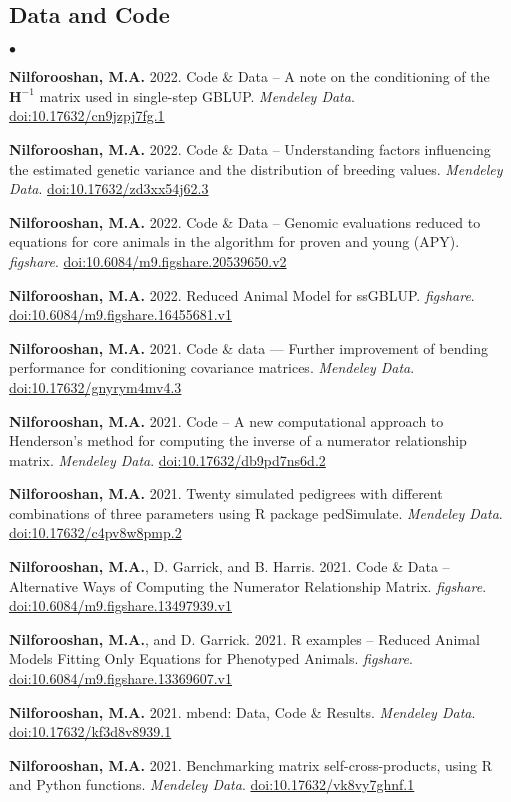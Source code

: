 \documentclass[margin,line]{res}
\newenvironment{list2}{
  \begin{list}{$\bullet$}{%
      \setlength{\itemsep}{0in}
      \setlength{\parsep}{0in} \setlength{\parskip}{0in}
      \setlength{\topsep}{0in} \setlength{\partopsep}{0in}
      \setlength{\leftmargin}{0.2in}}}{\end{list}}
\begin{document}
\begin{resume}
\section{\sc Data and Code}

\begin{list2}
\item {\bf Nilforooshan, M.A.} 2022. Code \& Data -- A note on the conditioning of the $\mathbf H^{-1}$ matrix used in single-step GBLUP. {\em Mendeley Data}. \href{https://doi.org/10.17632/cn9jzpj7fg.1}{doi:10.17632/cn9jzpj7fg.1}
\item {\bf Nilforooshan, M.A.} 2022. Code \& Data -- Understanding factors influencing the estimated genetic variance and the distribution of breeding values. {\em Mendeley Data}. \href{https://doi.org/10.17632/zd3xx54j62.3}{doi:10.17632/zd3xx54j62.3}
\item {\bf Nilforooshan, M.A.} 2022. Code \& Data -- Genomic evaluations reduced to equations for core animals in the algorithm for proven and young (APY). {\em figshare}. \href{https://doi.org/10.6084/m9.figshare.20539650.v1}{doi:10.6084/m9.figshare.20539650.v2}
\item {\bf Nilforooshan, M.A.} 2022. Reduced Animal Model for ssGBLUP. {\em figshare}. \href{https://doi.org/10.6084/m9.figshare.16455681.v1}{doi:10.6084/m9.figshare.16455681.v1}
\item {\bf Nilforooshan, M.A.} 2021. Code \& data --- Further improvement of bending performance for conditioning covariance matrices. {\em Mendeley Data}. \href{https://doi.org/10.17632/gnyrym4mv4.3}{doi:10.17632/gnyrym4mv4.3}
\item {\bf Nilforooshan, M.A.} 2021. Code -- A new computational approach to Henderson’s method for computing the inverse of a numerator relationship matrix. {\em Mendeley Data}. \href{https://doi.org/10.17632/db9pd7ns6d.2}{doi:10.17632/db9pd7ns6d.2}
\item {\bf Nilforooshan, M.A.} 2021. Twenty simulated pedigrees with different combinations of three parameters using R package pedSimulate. {\em Mendeley Data}. \href{https://doi.org/10.17632/c4pv8w8pmp.2}{doi:10.17632/c4pv8w8pmp.2}
\item {\bf Nilforooshan, M.A.}, D. Garrick, and B. Harris. 2021. Code \& Data -- Alternative Ways of Computing the Numerator Relationship Matrix. {\em figshare}. \href{https://doi.org/10.6084/m9.figshare.13497939.v1}{doi:10.6084/m9.figshare.13497939.v1}
\item {\bf Nilforooshan, M.A.}, and D. Garrick. 2021. R examples -- Reduced Animal Models Fitting Only Equations for Phenotyped Animals. {\em figshare}. \href{https://doi.org/10.6084/m9.figshare.13369607.v1}{doi:10.6084/m9.figshare.13369607.v1}
\item {\bf Nilforooshan, M.A.} 2021. mbend: Data, Code \& Results. {\em Mendeley Data}. \href{https://doi.org/10.17632/kf3d8v8939.1}{doi:10.17632/kf3d8v8939.1}
\item {\bf Nilforooshan, M.A.} 2021. Benchmarking matrix self-cross-products, using R and Python functions. {\em Mendeley Data}. \href{https://doi.org/10.17632/vk8vy7ghnf.1}{doi:10.17632/vk8vy7ghnf.1}
\end{list2}

\end{resume}
\end{document}
